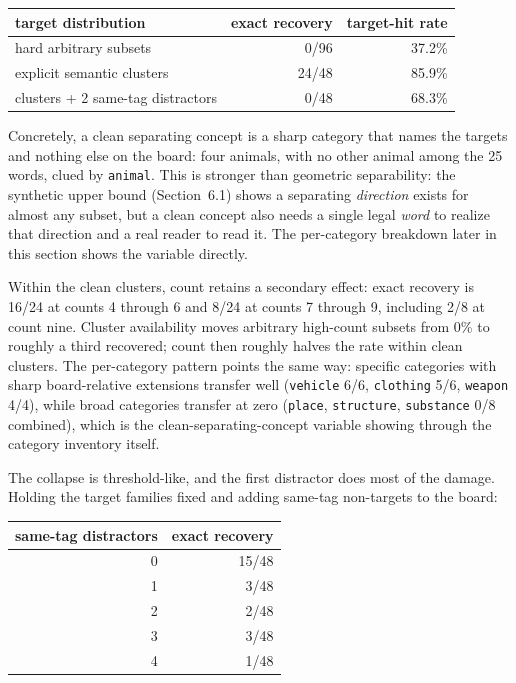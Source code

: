 \documentclass[11pt]{article}
\begin{document}
\begin{center}
\begin{tabular}{lrr}
\toprule
target distribution & exact recovery & target-hit rate \\
\midrule
hard arbitrary subsets & 0/96 & 37.2\% \\
explicit semantic clusters & 24/48 & 85.9\% \\
clusters + 2 same-tag distractors & 0/48 & 68.3\% \\
\bottomrule
\end{tabular}
\end{center}

Concretely, a clean separating concept is a sharp category that names the targets
and nothing else on the board: four animals, with no other animal among the 25
words, clued by \texttt{animal}. This is stronger than geometric separability:
the synthetic upper bound (Section~6.1) shows a separating \emph{direction} exists
for almost any subset, but a clean concept also needs a single legal \emph{word}
to realize that direction and a real reader to read it. The per-category
breakdown later in this section shows the variable directly.

Within the clean clusters, count retains a secondary effect: exact recovery is
16/24 at counts 4 through 6 and 8/24 at counts 7 through 9, including 2/8 at count
nine. Cluster availability moves arbitrary high-count subsets from 0\% to roughly
a third recovered; count then roughly halves the rate within clean clusters. The
per-category pattern points the same way: specific categories with sharp
board-relative extensions transfer well (\texttt{vehicle} 6/6, \texttt{clothing}
5/6, \texttt{weapon} 4/4), while broad categories transfer at zero
(\texttt{place}, \texttt{structure}, \texttt{substance} 0/8 combined), which is
the clean-separating-concept variable showing through the category inventory
itself.

The collapse is threshold-like, and the first distractor does most of the damage.
Holding the target families fixed and adding same-tag non-targets to the board:

\begin{center}
\begin{tabular}{rr}
\toprule
same-tag distractors & exact recovery \\
\midrule
0 & 15/48 \\
1 & 3/48 \\
2 & 2/48 \\
3 & 3/48 \\
4 & 1/48 \\
\bottomrule
\end{tabular}
\end{center}
\end{document}
